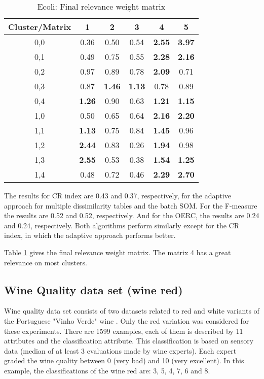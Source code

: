 \documentclass[10pt, conference, compsocconf]{IEEEtran}
\begin{document}
\begin{table}[!h]
\renewcommand{\arraystretch}{1.2}
\begin{center}
\caption{Ecoli: Final relevance weight matrix}
\begin{tabular}{|c|c|c|c|c|c|}
\hline
Cluster/Matrix & 1 & 2 & 3 & 4 & 5 \\ \hline
0,0 & 0.36 & 0.50 & 0.54 & \textbf{2.55} & \textbf{3.97} \\ \hline
0,1 & 0.49 & 0.75 & 0.55 & \textbf{2.28} & \textbf{2.16} \\ \hline
0,2 & 0.97 & 0.89 & 0.78 & \textbf{2.09} & 0.71 \\ \hline
0,3 & 0.87 & \textbf{1.46} & \textbf{1.13} & 0.78 & 0.89 \\ \hline
0,4 & \textbf{1.26} & 0.90 & 0.63 & \textbf{1.21} & \textbf{1.15} \\ \hline
1,0 & 0.50 & 0.65 & 0.64 & \textbf{2.16} & \textbf{2.20} \\ \hline
1,1 & \textbf{1.13} & 0.75 & 0.84 & \textbf{1.45} & 0.96 \\ \hline
1,2 & \textbf{2.44} & 0.83 & 0.26 & \textbf{1.94} & 0.98 \\ \hline
1,3 & \textbf{2.55} & 0.53 & 0.38 & \textbf{1.54} & \textbf{1.25} \\ \hline
1,4 & 0.48 & 0.72 & 0.46 & \textbf{2.29} & \textbf{2.70} \\ \hline

\end{tabular}
\label{ecoli_pesos}
\end{center}
\end{table}

The results for CR index are 0.43 and 0.37, respectively, for the adaptive approach for multiple dissimilarity tables and the batch SOM. For the F-measure the results are 0.52 and 0.52, respectively. And for the OERC, the results are 0.24 and 0.24, respectively. Both algorithms perform similarly except for the CR index, in which the adaptive approach performs better.

Table \ref{ecoli_pesos} gives the final relevance weight matrix. The matrix 4 has a great relevance on most clusters.

\subsection{Wine Quality data set (wine red)}

Wine quality data set consists of two datasets related to red and white variants of the Portuguese "Vinho Verde" wine \cite{Cortez:2009}. Only the red variation was considered for these experiments. There are 1599 examples, each of them is described by 11 attributes and the classification attribute. This classification is based on sensory data (median of at least 3 evaluations made by wine experts). Each expert graded the wine quality between 0 (very bad) and 10 (very excellent). In this example, the classifications of the wine red are: 3, 5, 4, 7, 6 and 8.
\end{document}
